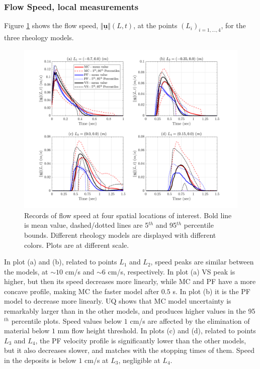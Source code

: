 \documentclass{article}
\begin{document}
\subsubsection{Flow Speed, local measurements}
Figure \ref{fig:Ramp-Vel} shows the flow speed, $\Vert \underline{\mathbf{u}} \Vert(L,t)$, at the points $(L_i)_{i=1,\dots,4}$, for the three rheology models.
\begin{figure}[H]
         \centering
        \includegraphics[width=1\textwidth]{NewTest/Velocity.png}
        \caption{Records of flow speed at four spatial locations of interest. Bold line is mean value, dashed/dotted lines are 5$^{th}$ and 95$^{th}$ percentile bounds. Different rheology models are displayed with different colors. Plots are at different scale.}
        \label{fig:Ramp-Vel}
\end{figure}
In plot (a) and (b), related to points $L_1$ and $L_2$, speed peaks are similar between the models, at $\sim 10$ cm/s and $\sim 6$ cm/s, respectively. In plot (a) VS peak is higher, but then its speed decreases more linearly, while MC and PF have a more concave profile, making MC the faster model after $0.5$ s. In plot (b) it is the PF model to decrease more linearly. UQ shows that MC model uncertainty is remarkably larger than in the other models, and produces higher values in the 95$^{th}$ percentile plots. Speed values below $1$ cm/s are affected by the elimination of material below $1$ mm flow height threshold. In plots (c) and (d), related to points $L_3$ and $L_4$, the PF velocity profile is significantly lower than the other models, but it also decreases slower, and matches with the stopping times of them. Speed in the deposits is below $1$ cm/s at $L_3$, negligible at $L_4$.
\end{document}
